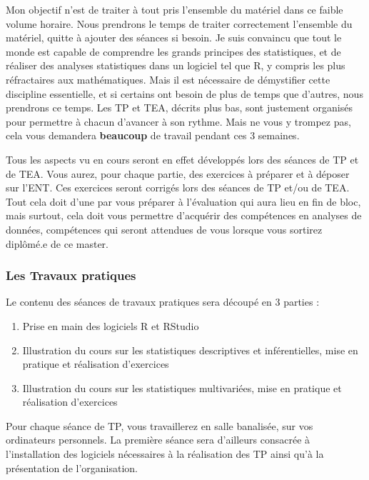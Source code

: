 \documentclass[a4paperpaper,]{article}
\providecommand{\tightlist}{%
  \setlength{\itemsep}{0pt}\setlength{\parskip}{0pt}}
\theoremstyle{definition}
\theoremstyle{definition}
\theoremstyle{definition}
\theoremstyle{remark}
\begin{document}
Mon objectif n'est de traiter à tout pris l'ensemble du matériel dans ce
faible volume horaire. Nous prendrons le temps de traiter correctement
l'ensemble du matériel, quitte à ajouter des séances si besoin. Je suis
convaincu que tout le monde est capable de comprendre les grands
principes des statistiques, et de réaliser des analyses statistiques
dans un logiciel tel que R, y compris les plus réfractaires aux
mathématiques. Mais il est nécessaire de démystifier cette discipline
essentielle, et si certains ont besoin de plus de temps que d'autres,
nous prendrons ce temps. Les TP et TEA, décrits plus bas, sont justement
organisés pour permettre à chacun d'avancer à son rythme. Mais ne vous y
trompez pas, cela vous demandera \textbf{beaucoup} de travail pendant
ces 3 semaines.

Tous les aspects vu en cours seront en effet développés lors des séances
de TP et de TEA. Vous aurez, pour chaque partie, des exercices à
préparer et à déposer sur l'ENT. Ces exercices seront corrigés lors des
séances de TP et/ou de TEA. Tout cela doit d'une par vous préparer à
l'évaluation qui aura lieu en fin de bloc, mais surtout, cela doit vous
permettre d'acquérir des compétences en analyses de données, compétences
qui seront attendues de vous lorsque vous sortirez diplômé.e de ce
master.

\subsubsection{Les Travaux pratiques}\label{les-travaux-pratiques}

Le contenu des séances de travaux pratiques sera découpé en 3 parties :

\begin{enumerate}
\def\labelenumi{\arabic{enumi}.}
\tightlist
\item
  Prise en main des logiciels R et RStudio
\item
  Illustration du cours sur les statistiques descriptives et
  inférentielles, mise en pratique et réalisation d'exercices
\item
  Illustration du cours sur les statistiques multivariées, mise en
  pratique et réalisation d'exercices
\end{enumerate}

Pour chaque séance de TP, vous travaillerez en salle banalisée, sur vos
ordinateurs personnels. La première séance sera d'ailleurs consacrée à
l'installation des logiciels nécessaires à la réalisation des TP ainsi
qu'à la présentation de l'organisation.
\end{document}
